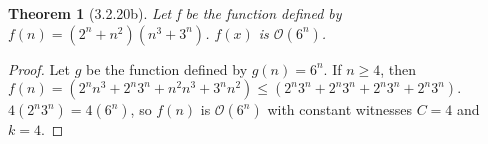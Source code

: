 \documentclass[a4paper, 12pt]{article}
\theoremstyle{plain}
\newtheorem*{theorem*}{Theorem}
\begin{document}
	
	\begin{theorem*}[3.2.20b]
		Let f be the function defined by $f(n) = (2^n + n^2)(n^3 + 3^n)$. $f(x)$ is $\mathcal{O}(6^n)$.
	\end{theorem*}
	
	\begin{proof}
		Let $g$ be the function defined by $g(n) = 6^n$. If $n \ge 4$, then \newline \newline \indent $f(n) = \left( 2^n n^3 + 2^n 3^n + n^2 n^3 + 3^n n^2 \right) \le \left( 2^n 3^n + 2^n 3^n + 2^n 3^n + 2^n 3^n \right).$ \newline \newline $4(2^n 3^n) = 4(6^n)$, so $f(n)$ is $\mathcal{O}(6^n)$ with constant witnesses $C = 4$ and $k = 4$.
	\end{proof}
\end{document}
